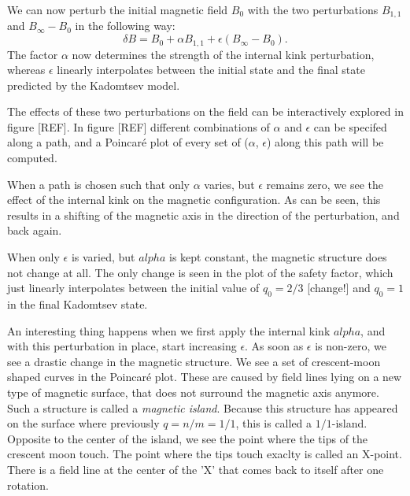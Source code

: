 \documentclass[%
superscriptaddress,
amsmath,amssymb,
aps,
pre,
floatfix,
]{revtex4-2}
\begin{document}
We can now perturb the initial magnetic field $B_0$ with the two perturbations $B_{1,1}$ and $B_\infty -B_0$ in the following way: 
\begin{equation}\label{eq:totalfield}
    \delta B =  B_0 + \alpha B_{1,1}+ \epsilon (B_\infty -B_0). 
\end{equation}
The factor $\alpha$ now determines the strength of the internal kink perturbation, whereas $\epsilon$ linearly interpolates between the initial state and the final state predicted by the Kadomtsev model. 

The effects of these two perturbations on the field can be interactively explored in figure [REF]. 
In figure [REF] different combinations of $\alpha$ and $\epsilon$ can be specifed along a path, and a Poincar\'e plot of every set of ($\alpha$, $\epsilon$) along this path will be computed. 

When a path is chosen such that only $\alpha$ varies, but $\epsilon$ remains zero, we see the effect of the internal kink on the magnetic configuration. 
As can be seen, this results in a shifting of the magnetic axis in the direction of the perturbation, and back again. 

When only $\epsilon$ is varied, but $alpha$ is kept constant, the magnetic structure does not change at all. 
The only change is seen in the plot of the safety factor, which just linearly interpolates between the initial value of $q_0=2/3$ [change!] and $q_0=1$ in the final Kadomtsev state. 

An interesting thing happens when we first apply the internal kink $alpha$, and with this perturbation in place, start increasing $\epsilon$. 
As soon as $\epsilon$ is non-zero, we see a drastic change in the magnetic structure. 
We see a set of crescent-moon shaped curves in the Poincar\'e plot. 
These are caused by field lines lying on a new type of magnetic surface, that does not surround the magnetic axis anymore. 
Such a structure is called a \emph{magnetic island}. 
Because this structure has appeared on the surface where previously $q=n/m=1/1$, this is called a $1/1$-island. 
Opposite to the center of the island, we see the point where the tips of the crescent moon touch. 
The point where the tips touch exaclty is called an X-point. 
There is a field line at the center of the 'X' that comes back to itself after one rotation. 
\end{document}
